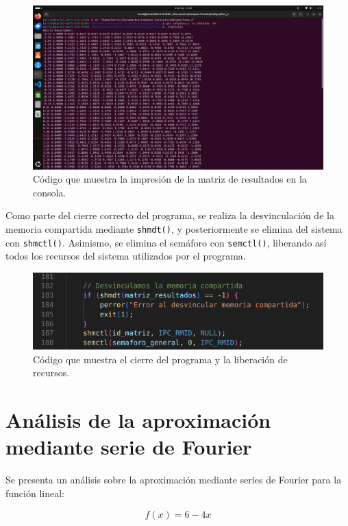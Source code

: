 {\begin{figure}[H]
    \centering
    \includegraphics[width=0.9\linewidth]{Figures/codigo/impresion_matriz.png}
    \caption[Impresión de la matriz de resultados]{Código que muestra la impresión de la matriz de resultados en la consola.}
    \label{fig:impresion-matriz}
\end{figure}

Como parte del cierre correcto del programa, se realiza la desvinculación de la memoria compartida mediante \texttt{shmdt()}, y posteriormente se elimina del sistema con \texttt{shmctl()}. Asimismo, se elimina el semáforo con \texttt{semctl()}, liberando así todos los recursos del sistema utilizados por el programa.

\begin{figure}[H]
    \centering
    \includegraphics[width=0.9\linewidth]{Figures/codigo/cierre.png}
    \caption[Cierre del programa y liberación de recursos]{Código que muestra el cierre del programa y la liberación de recursos.}
    \label{fig:cierre-programa}
\end{figure}


\section{Análisis de la aproximación mediante serie de Fourier}

Se presenta un análisis sobre la aproximación mediante series de Fourier para la función lineal:

\[f(x) = 6 - 4x\]


}
